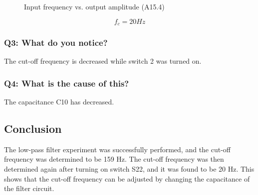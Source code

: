 \begin{figure}[H]
    \centering
    \caption{Input frequency vs. output amplitude (A15.4)}
    \label{fig:A15.4_graph}
\end{figure}
$$ f_c = 20Hz $$
\subsubsection{Q3: What do you notice?}
The cut-off frequency is decreased while switch 2 was turned on.
\subsubsection{Q4: What is the cause of this?}
The capacitance C10 has decreased.
\subsection{Conclusion}
The low-pass filter experiment was successfully performed, and the cut-off frequency was determined to be 159 Hz. The cut-off frequency was then determined again after turning on switch S22, and it was found to be 20 Hz. This shows that the cut-off frequency can be adjusted by changing the capacitance of the filter circuit.